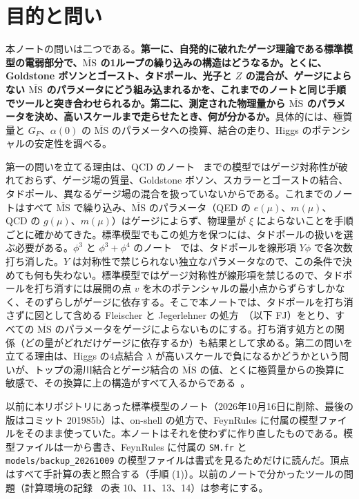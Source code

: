 \documentclass[a4paper,10pt]{ltjsarticle}
\newcommand{\MSbar}{\overline{\mathrm{MS}}}
\begin{document}
\tableofcontents

\section{目的と問い}\label{sec:intro}

本ノートの問いは二つである。\textbf{第一に、自発的に破れたゲージ理論である標準模型の電弱部分で、$\MSbar$ の1ループの繰り込みの構造はどうなるか。とくに、Goldstone ボソンとゴースト、タドポール、光子と $Z$ の混合が、ゲージによらない $\MSbar$ のパラメータにどう組み込まれるかを、これまでのノートと同じ手順でツールと突き合わせられるか。第二に、測定された物理量から $\MSbar$ のパラメータを決め、高いスケールまで走らせたとき、何が分かるか。}具体的には、極質量と $G_F$、$\alpha(0)$ の $\MSbar$ のパラメータへの換算、結合の走り、Higgs のポテンシャルの安定性を調べる。

第一の問いを立てる理由は、QCD のノート~\cite{qcdnote} までの模型ではゲージ対称性が破れておらず、ゲージ場の質量、Goldstone ボソン、スカラーとゴーストの結合、タドポール、異なるゲージ場の混合を扱っていないからである。これまでのノートはすべて $\MSbar$ で繰り込み、$\MSbar$ のパラメータ（QED の $e(\mu)$、$m(\mu)$、QCD の $g(\mu)$、$m(\mu)$）はゲージによらず、物理量が $\xi$ によらないことを手順ごとに確かめてきた。標準模型でもこの処方を保つには、タドポールの扱いを選ぶ必要がある。$\phi^3$ と $\phi^3+\phi^4$ のノート~\cite{phi3note,phi34note} では、タドポールを線形項 $Y\phi$ で各次数打ち消した。$Y$ は対称性で禁じられない独立なパラメータなので、この条件で決めても何も失わない。標準模型ではゲージ対称性が線形項を禁じるので、タドポールを打ち消すには展開の点 $v$ を木のポテンシャルの最小点からずらすしかなく、そのずらしがゲージに依存する。そこで本ノートでは、タドポールを打ち消さずに図として含める Fleischer と Jegerlehner の処方~\cite{fj81}（以下 FJ）をとり、すべての $\MSbar$ のパラメータをゲージによらないものにする。打ち消す処方との関係（どの量がどれだけゲージに依存するか）も結果として求める。第二の問いを立てる理由は、Higgs の4点結合 $\lambda$ が高いスケールで負になるかどうかという問いが、トップの湯川結合とゲージ結合の $\MSbar$ の値、とくに極質量からの換算に敏感で、その換算に上の構造がすべて入るからである~\cite{degrassi12,buttazzo13}。

以前に本リポジトリにあった標準模型のノート（2026年10月16日に削除、最後の版はコミット 201985b）は、on-shell の処方で、FeynRules に付属の模型ファイルをそのまま使っていた。本ノートはそれを使わずに作り直したものである。模型ファイルは一から書き、FeynRules に付属の \texttt{SM.fr} と \nolinkurl{models/backup_20261009} の模型ファイルは書式を見るためだけに読んだ。頂点はすべて手計算の表と照合する（手順 (1)）。以前のノートで分かったツールの問題（計算環境の記録~\cite{env} の表 10、11、13、14）は参考にする。
\end{document}

